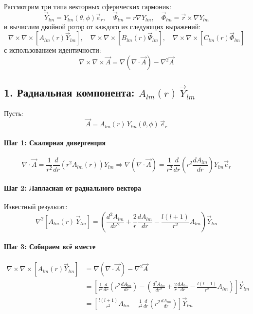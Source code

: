 \documentclass{article}
\begin{document}
Рассмотрим три типа векторных сферических гармоник:
\[
\vec{Y}_{lm} = Y_{lm}(\theta,\phi) \vec{e}_r, \quad
\vec{\Psi}_{lm} = r \nabla Y_{lm}, \quad
\vec{\Phi}_{lm} = \vec{r} \times \nabla Y_{lm}
\]
и вычислим двойной ротор от каждого из следующих выражений:
\[
\nabla \times \nabla \times [A_{lm}(r) \vec{Y}_{lm}], \quad
\nabla \times \nabla \times [B_{lm}(r) \vec{\Psi}_{lm}], \quad
\nabla \times \nabla \times [C_{lm}(r) \vec{\Phi}_{lm}]
\]
с использованием идентичности:
\[
\nabla \times \nabla \times \vec{A} = \nabla(\nabla \cdot \vec{A}) - \nabla^2 \vec{A}
\]

\subsection*{1. Радиальная компонента: $A_{lm}(r)\, \vec{Y}_{lm}$}

Пусть:
\[
\vec{A} = A_{lm}(r)\, Y_{lm}(\theta,\phi)\, \vec{e}_r
\]

\paragraph{Шаг 1: Скалярная дивергенция}
\[
\nabla \cdot \vec{A} = \frac{1}{r^2} \frac{d}{dr}\left( r^2 A_{lm}(r) \right) Y_{lm}
\Rightarrow
\nabla(\nabla \cdot \vec{A}) = \frac{1}{r^2} \frac{d}{dr} \left( r^2 \frac{dA_{lm}}{dr} \right) Y_{lm} \vec{e}_r
\]

\paragraph{Шаг 2: Лапласиан от радиального вектора}
Известный результат:
\[
\nabla^2 \left[ A_{lm}(r)\, \vec{Y}_{lm} \right] =
\left(
\frac{d^2 A_{lm}}{dr^2} + \frac{2}{r} \frac{dA_{lm}}{dr}
- \frac{l(l+1)}{r^2} A_{lm}
\right) \vec{Y}_{lm}
\]

\paragraph{Шаг 3: Собираем всё вместе}
\begin{align*}
\nabla \times \nabla \times [A_{lm}(r) \vec{Y}_{lm}]
&= \nabla(\nabla \cdot \vec{A}) - \nabla^2 \vec{A} \\
&= \left[
\frac{1}{r^2} \frac{d}{dr}(r^2 \frac{dA_{lm}}{dr})
- \left( \frac{d^2 A_{lm}}{dr^2} + \frac{2}{r} \frac{dA_{lm}}{dr} - \frac{l(l+1)}{r^2} A_{lm} \right)
\right] \vec{Y}_{lm} \\
&= \left[
\frac{l(l+1)}{r^2} A_{lm} - \frac{1}{r^2} \frac{d}{dr}(r^2 \frac{dA_{lm}}{dr})
\right] \vec{Y}_{lm}
\end{align*}
\end{document}
